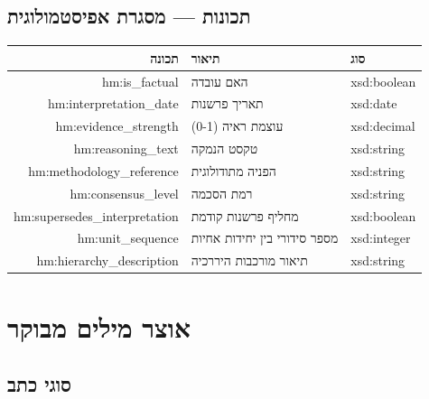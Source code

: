 \documentclass[12pt,a4paper]{article}
\newcommand{\en}[1]{\textenglish{\LR{#1}}}
\newcommand{\new}[1]{\textcolor{newaddition}{#1}}
\newcommand{\newprop}[1]{\textcolor{newaddition}{#1}}
\begin{document}
\subsection{\new{תכונות   — מסגרת אפיסטמולוגית}}

\begin{longtable}{|r|p{5cm}|p{3cm}|}
\hline
\textbf{תכונה} & \textbf{תיאור} & \textbf{סוג} \\
\hline
\endhead

\newprop{hm:is\_factual} & \new{האם עובדה} & \new{xsd:boolean}\\
\hline
\newprop{hm:interpretation\_date} & \new{תאריך פרשנות} & \new{xsd:date}\\
\hline
\newprop{hm:evidence\_strength} & \new{עוצמת ראיה (0-1)} & \new{xsd:decimal}\\
\hline
\newprop{hm:reasoning\_text} & \new{טקסט הנמקה} & \new{xsd:string}\\
\hline
\newprop{hm:methodology\_reference} & \new{הפניה מתודולוגית} & \new{xsd:string}\\
\hline
\newprop{hm:consensus\_level} & \new{רמת הסכמה} & \new{xsd:string}\\
\hline

\newprop{hm:supersedes\_interpretation} & \new{מחליף פרשנות קודמת} & \new{xsd:boolean}\\
\hline

\newprop{hm:unit\_sequence} & \new{מספר סידורי בין יחידות אחיות} & \new{xsd:integer}\\
\hline

\newprop{hm:hierarchy\_description} & \new{תיאור מורכבות היררכיה} & \new{xsd:string}\\
\hline
\end{longtable}

\newpage

\section{אוצר מילים מבוקר \en{(Instances)}}

\subsection{סוגי כתב}
\end{document}
